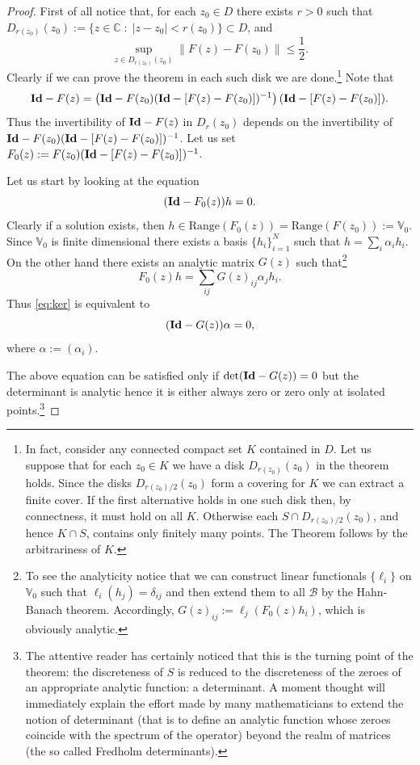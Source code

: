 \documentclass{amsart}
\numberwithin{equation}{section}
\newcommand\B{{\mathcal B}}
\newcommand\C{{\mathbb C}}
\newcommand\V{{\mathbb V}}
\newcommand\Id{\text{\bf Id}}
\begin{document}
\begin{proof}
First of all notice that, for each  $z_0\in D$ there exists
$r>0$ such that $D_{r(z_0)}(z_0):=\{z\in\C\;:\;
|z-z_0|<r(z_0)\}\subset D$, and
\[
\sup_{z\in D_{r(z_0)}(z_0)}\|F(z)-F(z_0)\|\leq \frac 12.
\]
Clearly if we can prove the theorem in each such disk we are
done.\footnote{In fact, consider any connected compact set $K$
contained in $D$. Let us suppose that
for each $z_0\in K$ we have a disk $D_{r(z_0)}(z_0)$ in the theorem
holds.
Since the disks $D_{r(z_0)/2}(z_0)$ form a covering for $K$ we can
extract a finite cover. If the first alternative holds in one such
disk then, by connectness, it must hold on all $K$. Otherwise each
$S\cap D_{r(z_0)/2}(z_0)$, and hence $K\cap S$, contains only finitely
many points. The Theorem follows by the
arbitrariness of $K$.}
Note that
\[
\Id-F(z)=\left(\Id-F(z_0)(\Id-[F(z)-F(z_0)])^{-1}\right)(\Id-[F(z)-F(z_0)]).
\]
Thus the invertibility of $\Id-F(z)$ in $D_r(z_0)$ depends on the
invertibility of $\Id-F(z_0)(\Id-[F(z)-F(z_0)])^{-1}$. Let us set
$F_0(z):=F(z_0)(\Id-[F(z)-F(z_0)])^{-1}$.

Let us start by looking at the equation
\begin{equation}\label{eq:ker}
(\Id-F_0(z))h=0.
\end{equation}
Clearly if a solution exists, then
$h\in\text{Range}(F_0(z))=\text{Range}(F(z_0)):=\V_0$. Since $\V_0$ is
finite dimensional  
there exists a basis $\{h_i\}_{i=1}^N$ such that
$h=\sum_i\alpha_i h_i$. On the other hand there exists an analytic
matrix $G(z)$ such that\footnote{To see the analyticity notice that we
can construct linear functionals $\{\ell_i\}$ on $\V_0$ such that
$\ell_i(h_j)=\delta_{ij}$ and then extend them to all $\B$ by the
Hahn-Banach theorem. Accordingly, $G(z)_{ij}:=\ell_j(F_0(z)h_i)$, which
is obviously analytic.}
\[
F_0(z)h=\sum_{ij}G(z)_{ij}\alpha_j h_i.
\]
Thus \eqref{eq:ker} is equivalent to
\[
(\Id-G(z))\alpha=0,
\]
where $\alpha:=(\alpha_i)$.

The above equation can be satisfied only if $\det(\Id-G(z))=0$ but the
determinant is analytic hence it is either always zero or zero only at
isolated points.\footnote{The attentive reader has certainly noticed that this
is the turning point of the theorem: the discreteness of $S$ is
reduced to the discreteness of the zeroes of an appropriate analytic
function: a determinant. A moment thought will immediately explain the
effort made by many mathematicians to extend the notion of determinant
(that is to define an analytic function whose zeroes coincide with the
spectrum of the operator) 
beyond the realm of matrices (the so called Fredholm determinants).}


\end{proof}
\end{document}
